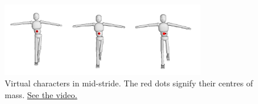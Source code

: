 \documentclass{sig-alternate-05-2015}
\begin{document}
%
\author{
%
%
\alignauthor
Monty Thibault \\
	   \\
	   \\
\alignauthor
Paul Kry\\
       \\
       \\
}


\maketitle

\begin{figure}
\noindent\includegraphics[width=250pt]{snip_fig}
\caption{Virtual characters in mid-stride. The red dots signify their centres of mass. \href{https://youtu.be/JGDUO0vYXK0}{\color{blue} See the video.}}
\label{fig:cartwheel}
\end{figure}
\end{document}
